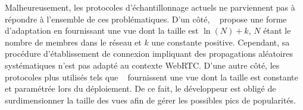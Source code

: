 





Malheureusement, les protocoles d'échantillonnage actuels ne parviennent pas à
répondre à l'ensemble de ces problématiques. D'un côté,
\SCAMP~\cite{ganesh2001scamp, ganesh2003peer} propose une forme d'adaptation en
fournissant une vue dont la taille est $\ln (N) + k$, $N$ étant le nombre de
membres dans le réseau et $k$ une constante positive. Cependant, sa procédure
d'établissement de connexion impliquant des propagations aléatoires
systématiques n'est pas adapté au contexte WebRTC. D'une autre côté, les
protocoles plus utilisés tels que \CYCLON~\cite{voulgaris2005cyclon} fournissent
une vue dont la taille est constante et paramétrée lors du déploiement. De ce
fait, le développeur est obligé de surdimensionner la taille des vues afin de
gérer les possibles pics de popularités.



